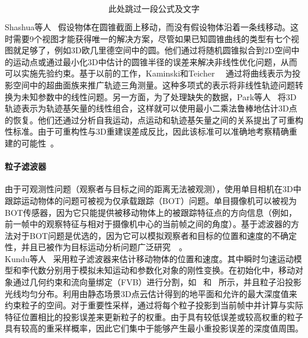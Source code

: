 $$此处跳过一段公式及文字$$

Shashua等人~\cite{shashua1999trajectory}
假设物体在圆锥截面上移动，而没有假设物体沿着一条线移动。这时需要9个视图才能获得唯一的解决方案，尽管如果已知圆锥曲线的类型有七个视图就足够了，例如3D欧几里德空间中的圆。他们通过将随机圆锥拟合到2D空间中的运动点或通过最小化3D中估计的圆锥半径的误差来解决非线性优化问题，从而可以实施先验约束。基于以前的工作，Kaminski和Teicher~\cite{kaminski2002general}~\cite{kaminski2004general}
通过将曲线表示为投影空间中的超曲面族来推广轨迹三角测量。这种多项式的表示将非线性轨迹问题转换为未知参数中的线性问题。另一方面，为了处理缺失的数据，Park等人~\cite{park20103d}
将3D轨迹表示为轨迹基矢量的线性组合，这样就可以使用最小二乘法鲁棒地估计3D点的恢复。他们还通过分析自我运动，点运动和轨迹基矢量之间的关系提出了可重构性标准。由于可重构性与3D重建误差成反比，因此该标准可以准确地考察精确重建的可能性~\cite{park20153d}。\\

\paragraph{粒子滤波器}
由于可观测性问题（观察者与目标之间的距离无法被观测），使用单目相机在3D中跟踪运动物体的问题可被视为仅承载跟踪（BOT）问题。单目摄像机可以被视为BOT传感器，因为它只能提供被移动物体上的被跟踪特征点的方向信息（例如，前一帧中的观察特征与相对于摄像机中心的当前帧之间的角度）。基于滤波器的方法对于BOT问题是优选的，因为它可以模拟观察者和目标的位置和速度的不确定性，并且已被作为目标运动分析问题广泛研究~\cite{aidala1983utilization}~\cite{le1998bearings}。\\

Kundu等人~\cite{kundu2011realtime}
采用粒子滤波器来估计移动物体的位置和速度。其中瞬时匀速运动模型和李代数分别用于模拟未知运动和参数化对象的刚性变换。在初始化中，移动对象通过几何约束和流向量绑定（FVB）进行分割，如~\cite{kundu2009moving}
和~\cite{kundu2010realtime}
所示，并且粒子沿投影光线均匀分布。利用由静态场景3D点云估计得到的地平面和允许的最大深度值来约束粒子的空间。对于重要性采样，通过将每个粒子投影到当前帧中并计算与实际特征位置相比的投影误差来更新粒子的权重。由于具有较低误差或较高权重的粒子具有较高的重采样概率，因此它们集中于能够产生最小重投影误差的深度值周围。

